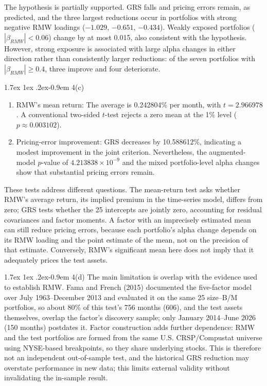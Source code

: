 \documentclass[11pt]{article}
\makeatletter
\renewcommand\paragraph{\@startsection{paragraph}{4}{0pt}%
  {1.7ex \@plus 1ex \@minus .2ex}{-0.9em}%
  {\normalfont\bfseries\normalsize\color{psink}}}
\makeatother
\begin{document}
The hypothesis is partially supported. GRS falls and pricing errors remain,
as predicted, and the three largest reductions occur in portfolios with
strong negative RMW loadings ($-1.029$, $-0.651$, $-0.434$). Weakly exposed
portfolios ($|\beta_{RMW}| < 0.06$) change by at most 0.015, also consistent
with the hypothesis. However, strong exposure is associated with large alpha
changes in either direction rather than consistently larger reductions: of
the seven portfolios with $|\beta_{RMW}| \geq 0.4$, three improve and four
deteriorate.

\paragraph{4(c)}
\begin{enumerate}
\setlength{\itemsep}{2pt}\setlength{\parskip}{0pt}
\item RMW's mean return: The average is 0.242804\% per month, with
$t = 2.966978$. A conventional two-sided $t$-test rejects a zero mean at the
1\% level ($p \approx 0.003102$).
\item Pricing-error improvement: GRS decreases by 10.588612\%, indicating a
modest improvement in the joint criterion. Nevertheless, the augmented-model
$p$-value of $4.213838\times10^{-9}$ and the mixed portfolio-level alpha
changes show that substantial pricing errors remain.
\end{enumerate}
These tests address different questions. The mean-return test asks whether
RMW's average return, its implied premium in the time-series model, differs
from zero; GRS tests whether the 25 intercepts are jointly zero, accounting
for residual covariances and factor moments. A factor with an imprecisely
estimated mean can still reduce pricing errors, because each portfolio's
alpha change depends on its RMW loading and the point estimate of the mean,
not on the precision of that estimate. Conversely, RMW's significant mean
here does not imply that it adequately prices the test assets.

\paragraph{4(d)} The main limitation is overlap with the evidence used to
establish RMW. Fama and French (2015) documented the five-factor model over
July 1963--December 2013 and evaluated it on the same 25 size--B/M
portfolios, so about 80\% of this test's 756 months (606), and the test
assets themselves, overlap the factor's discovery sample; only January
2014--June 2026 (150 months) postdates it. Factor construction adds further
dependence: RMW and the test portfolios are formed from the same U.S.
CRSP/Compustat universe using NYSE-based breakpoints, so they share
underlying stocks. This is therefore not an independent out-of-sample test,
and the historical GRS reduction may overstate performance in new data; this
limits external validity without invalidating the in-sample result.
\end{document}
